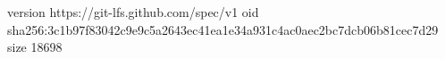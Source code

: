 version https://git-lfs.github.com/spec/v1
oid sha256:3c1b97f83042c9e9c5a2643ec41ea1e34a931c4ac0aec2bc7dcb06b81cec7d29
size 18698

